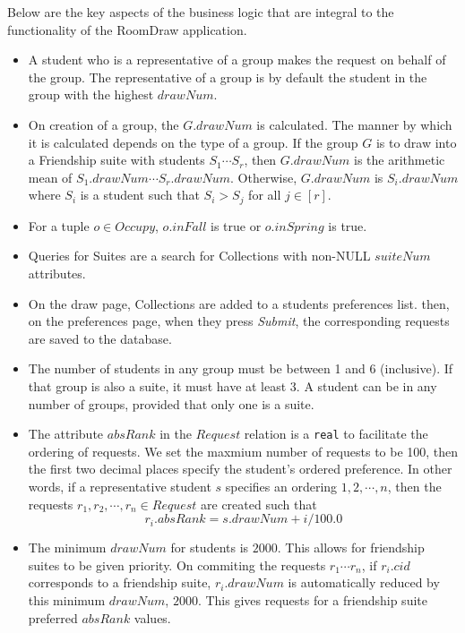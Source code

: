 \documentclass{article}
\begin{document}
\noindent Below are the key aspects of the business logic that are integral to the functionality of the RoomDraw application.

\begin{itemize}
\item A student who is a representative of a group makes the request on behalf of the group. The representative of a group is by default the student in the group with the highest $drawNum$.

\item On creation of a group, the $G.drawNum$ is calculated. The manner by which it is calculated depends on the type of a group.  If the group $G$ is to draw into a Friendship suite with students $S_1 \cdots S_r$, then $G.drawNum$ is the arithmetic mean of $S_1.drawNum \cdots S_r.drawNum$. Otherwise, $G.drawNum$ is $S_i.drawNum$ where $S_i$ is a student such that $S_i > S_j$ for all $j \in [r]$.

\item For a tuple $o \in Occupy$, $o.inFall$ is true or $o.inSpring$ is true.

\item Queries for Suites are a search for Collections with non-NULL $suiteNum$ attributes.

\item On the draw page, Collections are added to a students preferences list.  then, on the preferences page, when they press \textit{Submit}, the corresponding requests are saved to the database.

\item The number of students in any group must be between 1 and 6 (inclusive).  If that group is also a suite, it must have at least 3. A student can be in any number of groups, provided that only one is a suite.

\item The attribute $absRank$ in the $Request$ relation is a \texttt{real} to facilitate the ordering of requests.  We set the maxmium number of requests to be 100, then the first two decimal places specify the student's ordered preference. In other words, if a representative student $s$ specifies an ordering $1,2,\cdots, n$, then the requests $r_1,r_2, \cdots, r_n \in Request$ are created such that \[r_i.absRank = s.drawNum + i/100.0\]

\item The minimum $drawNum$ for students is $2000$. This allows for friendship suites to be given priority. On commiting the requests $r_1\cdots r_n$, if $r_i.cid$ corresponds to a friendship suite, $r_i.drawNum$ is automatically reduced by this minimum $drawNum$, $2000$. This gives requests for a friendship suite preferred $absRank$ values.

\end{itemize}
\end{document}
